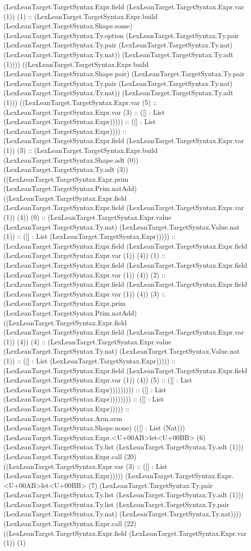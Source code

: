 \documentclass[11pt]{article}
\begin{document}
(LexLeanTarget.TargetSyntax.Expr.field (LexLeanTarget.TargetSyntax.Expr.var (1)) (1) :: (LexLeanTarget.TargetSyntax.Expr.build (LexLeanTarget.TargetSyntax.Shape.some) (LexLeanTarget.TargetSyntax.Ty.option (LexLeanTarget.TargetSyntax.Ty.pair (LexLeanTarget.TargetSyntax.Ty.pair (LexLeanTarget.TargetSyntax.Ty.nat) (LexLeanTarget.TargetSyntax.Ty.nat)) (LexLeanTarget.TargetSyntax.Ty.adt (1)))) ((LexLeanTarget.TargetSyntax.Expr.build (LexLeanTarget.TargetSyntax.Shape.pair) (LexLeanTarget.TargetSyntax.Ty.pair (LexLeanTarget.TargetSyntax.Ty.pair (LexLeanTarget.TargetSyntax.Ty.nat) (LexLeanTarget.TargetSyntax.Ty.nat)) (LexLeanTarget.TargetSyntax.Ty.adt (1))) ((LexLeanTarget.TargetSyntax.Expr.var (5) :: (LexLeanTarget.TargetSyntax.Expr.var (3) :: ([] : List (LexLeanTarget.TargetSyntax.Expr))))) :: ([] : List (LexLeanTarget.TargetSyntax.Expr)))) :: (LexLeanTarget.TargetSyntax.Expr.field (LexLeanTarget.TargetSyntax.Expr.var (1)) (3) :: (LexLeanTarget.TargetSyntax.Expr.build (LexLeanTarget.TargetSyntax.Shape.adt (0)) (LexLeanTarget.TargetSyntax.Ty.adt (3)) ((LexLeanTarget.TargetSyntax.Expr.prim (LexLeanTarget.TargetSyntax.Prim.natAdd) ((LexLeanTarget.TargetSyntax.Expr.field (LexLeanTarget.TargetSyntax.Expr.field (LexLeanTarget.TargetSyntax.Expr.var (1)) (4)) (0) :: (LexLeanTarget.TargetSyntax.Expr.value (LexLeanTarget.TargetSyntax.Ty.nat) (LexLeanTarget.TargetSyntax.Value.nat (1)) :: ([] : List (LexLeanTarget.TargetSyntax.Expr))))) :: (LexLeanTarget.TargetSyntax.Expr.field (LexLeanTarget.TargetSyntax.Expr.field (LexLeanTarget.TargetSyntax.Expr.var (1)) (4)) (1) :: (LexLeanTarget.TargetSyntax.Expr.field (LexLeanTarget.TargetSyntax.Expr.field (LexLeanTarget.TargetSyntax.Expr.var (1)) (4)) (2) :: (LexLeanTarget.TargetSyntax.Expr.field (LexLeanTarget.TargetSyntax.Expr.field (LexLeanTarget.TargetSyntax.Expr.var (1)) (4)) (3) :: (LexLeanTarget.TargetSyntax.Expr.prim (LexLeanTarget.TargetSyntax.Prim.natAdd) ((LexLeanTarget.TargetSyntax.Expr.field (LexLeanTarget.TargetSyntax.Expr.field (LexLeanTarget.TargetSyntax.Expr.var (1)) (4)) (4) :: (LexLeanTarget.TargetSyntax.Expr.value (LexLeanTarget.TargetSyntax.Ty.nat) (LexLeanTarget.TargetSyntax.Value.nat (1)) :: ([] : List (LexLeanTarget.TargetSyntax.Expr))))) :: (LexLeanTarget.TargetSyntax.Expr.field (LexLeanTarget.TargetSyntax.Expr.field (LexLeanTarget.TargetSyntax.Expr.var (1)) (4)) (5) :: ([] : List (LexLeanTarget.TargetSyntax.Expr))))))))) :: ([] : List (LexLeanTarget.TargetSyntax.Expr)))))))) :: ([] : List (LexLeanTarget.TargetSyntax.Expr))))) :: (LexLeanTarget.TargetSyntax.Arm.arm (LexLeanTarget.TargetSyntax.Shape.none) (([] : List (Nat))) (LexLeanTarget.TargetSyntax.Expr.<U+00AB>let<U+00BB> (6) (LexLeanTarget.TargetSyntax.Ty.list (LexLeanTarget.TargetSyntax.Ty.adt (1))) (LexLeanTarget.TargetSyntax.Expr.call (20) ((LexLeanTarget.TargetSyntax.Expr.var (3) :: ([] : List (LexLeanTarget.TargetSyntax.Expr))))) (LexLeanTarget.TargetSyntax.Expr.<U+00AB>let<U+00BB> (7) (LexLeanTarget.TargetSyntax.Ty.pair (LexLeanTarget.TargetSyntax.Ty.list (LexLeanTarget.TargetSyntax.Ty.adt (1))) (LexLeanTarget.TargetSyntax.Ty.list (LexLeanTarget.TargetSyntax.Ty.pair (LexLeanTarget.TargetSyntax.Ty.nat) (LexLeanTarget.TargetSyntax.Ty.nat)))) (LexLeanTarget.TargetSyntax.Expr.call (22) ((LexLeanTarget.TargetSyntax.Expr.field (LexLeanTarget.TargetSyntax.Expr.var (1)) (1) 
\end{document}
